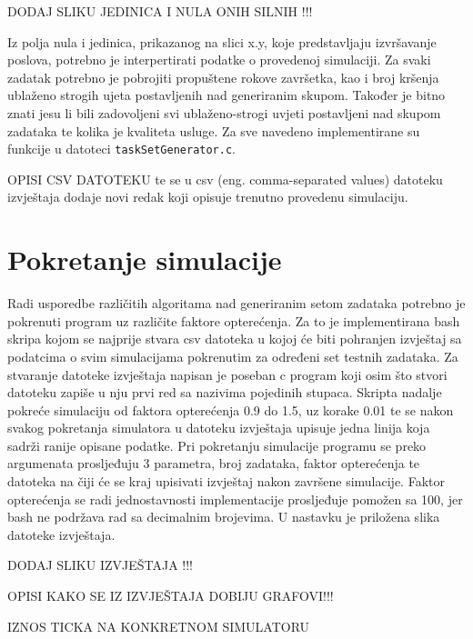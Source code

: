 \documentclass[../zavrsni.tex]{subfiles}
\begin{document}
DODAJ SLIKU JEDINICA I NULA ONIH SILNIH !!!

Iz polja nula i jedinica, prikazanog na slici x.y, koje predstavljaju izvršavanje poslova, potrebno je interpertirati podatke o provedenoj simulaciji.
Za svaki zadatak potrebno je pobrojiti propuštene rokove završetka, kao i broj kršenja ublaženo strogih ujeta postavljenih nad generiranim skupom.
Također je bitno znati jesu li bili zadovoljeni svi ublaženo-strogi uvjeti 
postavljeni nad skupom zadataka te kolika je kvaliteta usluge. Za sve navedeno implementirane su funkcije u datoteci \texttt{taskSetGenerator.c}.

OPISI CSV DATOTEKU
te se u csv (eng. comma-separated values) datoteku izvještaja dodaje novi redak koji opisuje trenutno provedenu simulaciju. 

\section{Pokretanje simulacije}

Radi usporedbe različitih algoritama nad generiranim setom zadataka potrebno je pokrenuti program uz različite faktore opterećenja. 
Za to je implementirana bash skripa kojom se najprije stvara csv datoteka u kojoj će biti pohranjen izvještaj sa podatcima o 
svim simulacijama pokrenutim za određeni set testnih zadataka. Za stvaranje datoteke izvještaja napisan je poseban c program koji osim što
stvori datoteku zapiše u nju prvi red sa nazivima pojedinih stupaca.
Skripta nadalje pokreće simulaciju od faktora opterećenja 0.9 do 1.5, uz korake 0.01 te se nakon svakog pokretanja simulatora u 
datoteku izvještaja upisuje jedna linija koja sadrži ranije opisane podatke.
Pri pokretanju simulacije programu se preko argumenata prosljeđuju 3 parametra, broj zadataka, 
faktor opterećenja te datoteka na čiji će se kraj upisivati izvještaj nakon završene simulacije.
Faktor opterećenja se radi jednostavnosti implementacije prosljeđuje pomožen sa 100, jer bash ne podržava rad sa decimalnim brojevima.
U nastavku je priložena slika datoteke izvještaja.

DODAJ SLIKU IZVJEŠTAJA !!!

OPISI KAKO SE IZ IZVJEŠTAJA DOBIJU GRAFOVI!!!

IZNOS TICKA NA KONKRETNOM SIMULATORU
\end{document}
